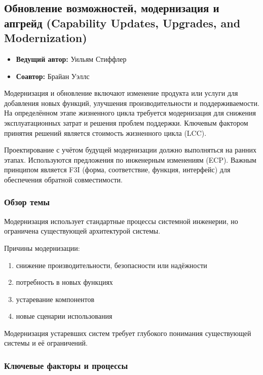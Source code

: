 \documentclass[14pt,a4paper]{extarticle}
\begin{document}
\subsection{Обновление возможностей, модернизация и апгрейд (Capability Updates, Upgrades, and Modernization)}

\begin{itemize}
\item \textbf{Ведущий автор:} Уильям Стиффлер
\item \textbf{Соавтор:} Брайан Уэллс
\end{itemize}

Модернизация и обновление включают изменение продукта или услуги для добавления новых функций, улучшения производительности и поддерживаемости. На определённом этапе жизненного цикла требуется модернизация для снижения эксплуатационных затрат и решения проблем поддержки. Ключевым фактором принятия решений является стоимость жизненного цикла (LCC).

Проектирование с учётом будущей модернизации должно выполняться на ранних этапах. Используются предложения по инженерным изменениям (ECP). Важным принципом является F3I (форма, соответствие, функция, интерфейс) для обеспечения обратной совместимости.

\subsubsection{Обзор темы}

Модернизация использует стандартные процессы системной инженерии, но ограничена существующей архитектурой системы.

Причины модернизации:

\begin{enumerate}
\item снижение производительности, безопасности или надёжности
\item потребность в новых функциях
\item устаревание компонентов
\item новые сценарии использования
\end{enumerate}

Модернизация устаревших систем требует глубокого понимания существующей системы и её ограничений.

\subsubsection{Ключевые факторы и процессы}
\end{document}
